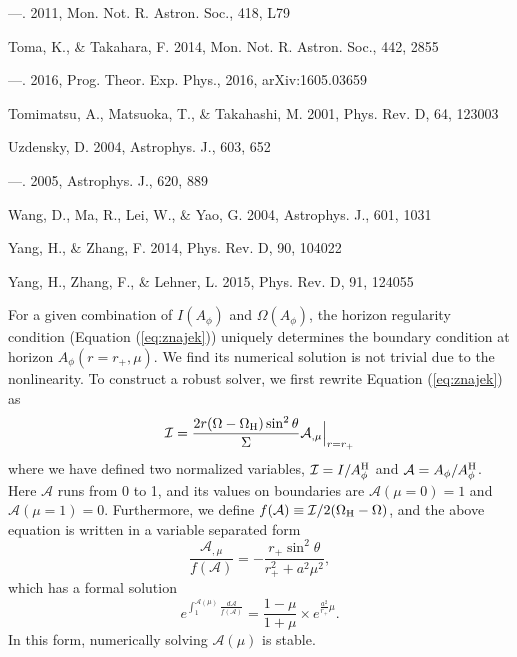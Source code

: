 \documentclass[iop,apj]{emulateapj}
\def\sst{\sin^2\theta}
\def\be{\begin{equation}}
\def\ee{\end{equation}}
\def\WH{\Omega_{\rm H}}
\def\AB{A_\phi^{\rm H}}
\begin{document}
\begin{thebibliography}{}
---. 2011, Mon. Not. R. Astron. Soc., 418, L79

Toma, K., \& Takahara, F. 2014, Mon. Not. R. Astron. Soc., 442, 2855

---. 2016, Prog. Theor. Exp. Phys., 2016, arXiv:1605.03659

Tomimatsu, A., Matsuoka, T., \& Takahashi, M. 2001, Phys. Rev. D, 64, 123003

Uzdensky, D. 2004, Astrophys. J., 603, 652

---. 2005, Astrophys. J., 620, 889

Wang, D., Ma, R., Lei, W., \& Yao, G. 2004, Astrophys. J., 601, 1031

Yang, H., \& Zhang, F. 2014, Phys. Rev. D, 90, 104022

Yang, H., Zhang, F., \& Lehner, L. 2015, Phys. Rev. D, 91, 124055

\end{thebibliography}




\appendix
\label{sec:app}
For a given combination of $I(A_\phi)$ and $\Omega(A_\phi)$,
the horizon regularity condition (Equation (\ref{eq:znajek}))
uniquely determines the boundary condition at horizon $A_\phi(r= r_+, \mu)$.
We find its numerical solution is not trivial due to the nonlinearity.
To construct a robust solver, we first rewrite Equation (\ref{eq:znajek}) as
\be
    \mathcal I = \frac{2r(\Omega-\WH)\sst}{\Sigma} \mathcal A_{,\mu}\Big|_{r=r_+}
\ee
where we have defined two normalized variables, $\mathcal I = I / \AB$ and $\mathcal A = A_\phi / \AB$.
Here $\mathcal A $ runs from 0 to 1, and its values on boundaries are
$\mathcal A(\mu=0) = 1$ and $\mathcal A(\mu=1) = 0$.
Furthermore, we define $f(\mathcal A) \equiv \mathcal I/2(\WH - \Omega) $, and the above equation
is written in a variable separated form
\be
\frac{\mathcal A_{,\mu}}{f(\mathcal A)} = -\frac{r_+ \sst}{r_+^2 + a^2\mu^2},
\ee
which has a formal solution
\be
\label{eq:fs}
e^{\int_1^{\mathcal A(\mu)}\frac{d\mathcal A}{f(\mathcal A)}}
 = \frac{1-\mu}{1+\mu} \times e^{\frac{a^2}{r_+}\mu}.
\ee
In this form, numerically solving $\mathcal A(\mu)$ is stable.
\end{document}
